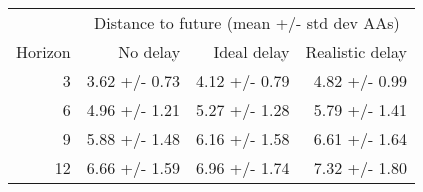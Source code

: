 
\begin{tabular*}{0.7\textwidth}{rrrr}
\toprule
          & \multicolumn{3}{c}{Distance to future (mean +/- std dev AAs)} \\
  Horizon & No delay & Ideal delay & Realistic delay \\
\midrule

3 & 3.62 +/- 0.73 & 4.12 +/- 0.79 & 4.82 +/- 0.99 \\
6 & 4.96 +/- 1.21 & 5.27 +/- 1.28 & 5.79 +/- 1.41 \\
9 & 5.88 +/- 1.48 & 6.16 +/- 1.58 & 6.61 +/- 1.64 \\
12 & 6.66 +/- 1.59 & 6.96 +/- 1.74 & 7.32 +/- 1.80 \\

\bottomrule
\end{tabular*}


